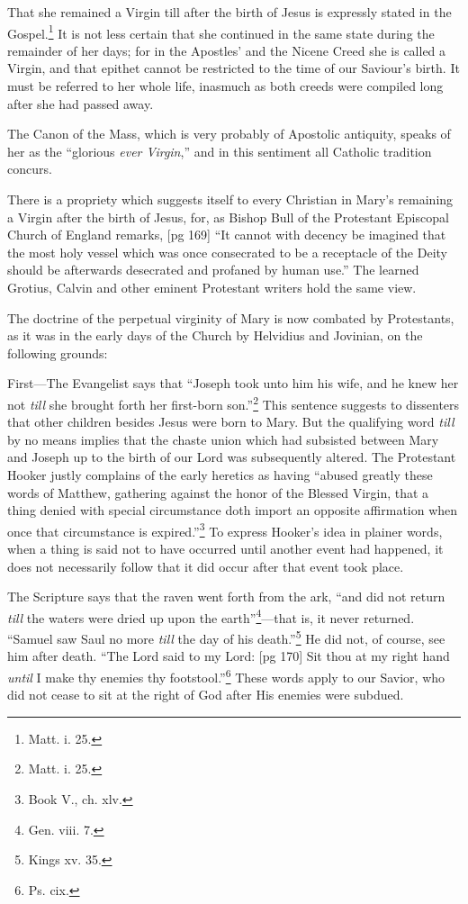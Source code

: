 That she remained a Virgin till after the birth
of Jesus is expressly stated in the Gospel.\footnote{Matt. i. 25.} It
is not less certain that she continued in the same
state during the remainder of her days; for in
the Apostles' and the Nicene Creed she is called
a Virgin, and that epithet cannot be restricted to
the time of our Saviour's birth. It must be referred
to her whole life, inasmuch as both creeds
were compiled long after she had passed away.

The Canon of the Mass, which is very probably
of Apostolic antiquity, speaks of her as the “glorious
\emph{ever Virgin},” and in this sentiment all Catholic
tradition concurs.

There is a propriety which suggests itself to
every Christian in Mary's remaining a Virgin
after the birth of Jesus, for, as Bishop Bull of
the Protestant Episcopal Church of England remarks,
[pg 169]
“It cannot with decency be imagined that
the most holy vessel which was once consecrated
to be a receptacle of the Deity should be afterwards
desecrated and profaned by human use.”
The learned Grotius, Calvin and other eminent
Protestant writers hold the same view.

The doctrine of the perpetual virginity of Mary
is now combated by Protestants, as it was in the
early days of the Church by Helvidius and Jovinian,
on the following grounds:

First—The Evangelist says that “Joseph took
unto him his wife, and he knew her not \emph{till} she
brought forth her first-born son.”\footnote{Matt.
i. 25.} This sentence
suggests to dissenters that other children
besides Jesus were born to Mary. But the qualifying
word \emph{till} by no means implies that the chaste
union which had subsisted between Mary and
Joseph up to the birth of our Lord was subsequently
altered. The Protestant Hooker justly
complains of the early heretics as having “abused
greatly these words of Matthew, gathering against
the honor of the Blessed Virgin, that a thing denied
with special circumstance doth import an opposite
affirmation when once that circumstance is
expired.”\footnote{Book V., ch.
xlv.} To express Hooker's idea in plainer
words, when a thing is said not to have occurred
until another event had happened, it does not
necessarily follow that it did occur after that
event took place.

The Scripture says that the raven went forth
from the ark, “and did not return \emph{till} the waters
were dried up upon the earth”\footnote{Gen.
viii. 7.}—that is, it never
returned. “Samuel saw Saul no more \emph{till} the
day of his death.”\footnote{Kings xv.
35.} He did not, of course, see
him after death. “The Lord said to my Lord:
[pg 170]
Sit thou at my right hand \emph{until} I make thy enemies
thy footstool.”\footnote{Ps.
cix.} These words apply to our Savior,
who did not cease to sit at the right of God
after His enemies were subdued.

